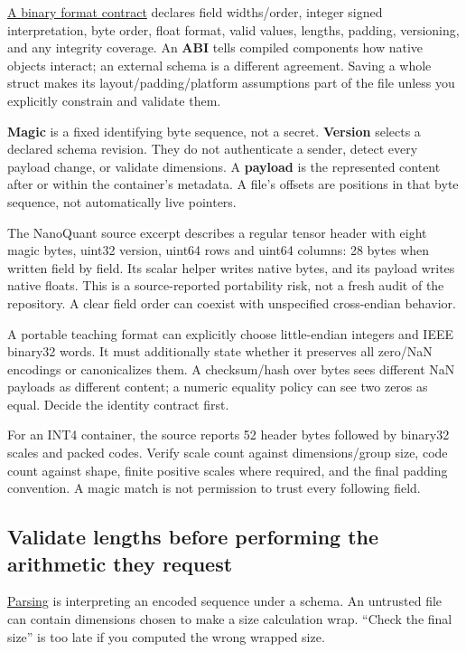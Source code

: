 \hyperref[appendix-590bbb2424c1]{A binary format contract} declares field widths/order, integer signed interpretation, byte order, float format, valid values, lengths, padding, versioning, and any integrity coverage. An \textbf{ABI} tells compiled components how native objects interact; an external schema is a different agreement. Saving a whole struct makes its layout/padding/platform assumptions part of the file unless you explicitly constrain and validate them.

\textbf{Magic} is a fixed identifying byte sequence, not a secret. \textbf{Version} selects a declared schema revision. They do not authenticate a sender, detect every payload change, or validate dimensions. A \textbf{payload} is the represented content after or within the container's metadata. A file's offsets are positions in that byte sequence, not automatically live pointers.

The NanoQuant source excerpt describes a regular tensor header with eight magic bytes, uint32 version, uint64 rows and uint64 columns: 28 bytes when written field by field. Its scalar helper writes native bytes, and its payload writes native floats. This is a source-reported portability risk, not a fresh audit of the repository. A clear field order can coexist with unspecified cross-endian behavior.

A portable teaching format can explicitly choose little-endian integers and IEEE binary32 words. It must additionally state whether it preserves all zero/NaN encodings or canonicalizes them. A checksum/hash over bytes sees different NaN payloads as different content; a numeric equality policy can see two zeros as equal. Decide the identity contract first.

For an INT4 container, the source reports 52 header bytes followed by binary32 scales and packed codes. Verify scale count against dimensions/group size, code count against shape, finite positive scales where required, and the final padding convention. A magic match is not permission to trust every following field.

\subsection{Validate lengths before performing the arithmetic they request}\label{05-engine-i-ch002-validate-lengths-before-performing-the-arithmetic-they-request}

\hyperref[appendix-652d81568de9]{Parsing} is interpreting an encoded sequence under a schema. An untrusted file can contain dimensions chosen to make a size calculation wrap. ``Check the final size'' is too late if you computed the wrong wrapped size.

